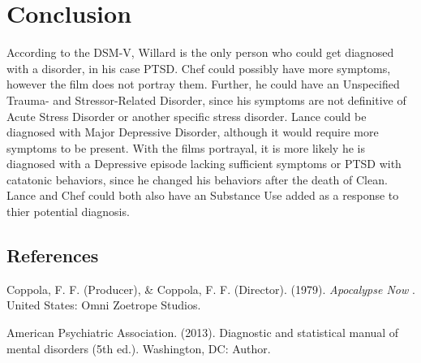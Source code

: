\documentclass[a4paper,man,natbib]{apa6}
\begin{document}
\section{Conclusion}	

According to the DSM-V, Willard is the only person who could get diagnosed with a disorder, in his case PTSD. Chef could possibly have more symptoms, however the film does not portray them. Further, he could have an Unspecified Trauma- and
Stressor-Related Disorder, since his symptoms are not definitive of Acute Stress Disorder or another specific stress disorder. Lance could be diagnosed with Major Depressive Disorder, although it would require more symptoms to be present. With the films portrayal, it is more likely he is diagnosed with a Depressive episode lacking sufficient symptoms or PTSD with catatonic behaviors, since he changed his behaviors after the death of Clean. Lance and Chef could both also have an Substance Use added as a response to thier potential diagnosis. \\

\raggedbottom
\pagebreak
\subsection{References}

\noindent Coppola, F. F. (Producer), \& Coppola, F. F. (Director). (1979). \textit{Apocalypse Now}
. United States: Omni Zoetrope Studios.

\noindent American Psychiatric Association. (2013). Diagnostic and statistical manual of mental
\indent disorders (5th ed.). Washington, DC: Author.
\end{document}
